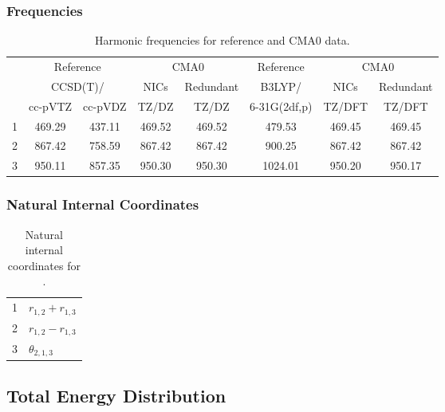 \documentclass[10pt,oneside]{article}
\begin{document}
\begin{table}[h!]
\subsubsection*{Frequencies}
\centering
\caption{Harmonic frequencies for reference and CMA0 data.}
\begin{tabular}{cccccccc}
\toprule
{} & \multicolumn{2}{c}{Reference} & \multicolumn{2}{c}{CMA0} &    Reference & \multicolumn{2}{c}{CMA0} \\
{} & \multicolumn{2}{c}{CCSD(T)/} &   NICs &  Redundant &       B3LYP/ &   NICs & Redundant \\
{} &   cc-pVTZ & cc-pVDZ &  TZ/DZ &      TZ/DZ & 6-31G(2df,p) & TZ/DFT &    TZ/DFT \\
\midrule
1 &    469.29 &  437.11 & 469.52 &     469.52 &       479.53 & 469.45 &    469.45 \\
2 &    867.42 &  758.59 & 867.42 &     867.42 &       900.25 & 867.42 &    867.42 \\
3 &    950.11 &  857.35 & 950.30 &     950.30 &      1024.01 & 950.20 &    950.17 \\
\bottomrule
\end{tabular}
\end{table}

\begin{table}[h!]
\subsubsection*{Natural Internal Coordinates}
\centering
\caption{Natural internal coordinates for .}
\small
\begin{tabular}{ll}
\toprule
  1   & $r_{1,2} + r_{1,3}$ \\
  2   & $r_{1,2} - r_{1,3}$ \\
  3   & $\theta_{2,1,3}$ \\
\bottomrule
\end{tabular}
\end{table}

\begin{table}
\subsection*{Total Energy Distribution}
\centering\end{table}

\clearpage

\subsection{}
\end{document}
